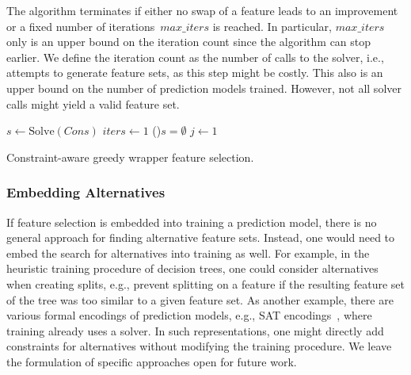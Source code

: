 \documentclass{article}
\theoremstyle{definition}
\begin{document}
The algorithm terminates if either no swap of a feature leads to an improvement or a fixed number of iterations~$max\_iters$ is reached.
In particular, $max\_iters$ only is an upper bound on the iteration count since the algorithm can stop earlier.
We define the iteration count as the number of calls to the solver, i.e., attempts to generate feature sets, as this step might be costly.
This also is an upper bound on the number of prediction models trained.
However, not all solver calls might yield a valid feature set.

\begin{algorithm}[htb]
	\DontPrintSemicolon
	\BlankLine
	$s \leftarrow \text{Solve}(Cons)$ 
	$iters \leftarrow 1$ 
	\If(){$s = \emptyset$}{
		\Return{$\emptyset$}
	}
	$j \leftarrow 1$ 
	\caption{Constraint-aware greedy wrapper feature selection.}
	\label{al:afs:greedy-wrapper}
\end{algorithm}

\subsubsection{Embedding Alternatives}
\label{sec:afs:approach:objectives:embedding}

If feature selection is embedded into training a prediction model, there is no general approach for finding alternative feature sets.
Instead, one would need to embed the search for alternatives into training as well.
For example, in the heuristic training procedure of decision trees, one could consider alternatives when creating splits, e.g., prevent splitting on a feature if the resulting feature set of the tree was too similar to a given feature set.
As another example, there are various formal encodings of prediction models, e.g., \textsc{SAT} encodings~\cite{narodytska2018learning, schidler2021sat, yu2021learning}, where training already uses a solver.
In such representations, one might directly add constraints for alternatives without modifying the training procedure.
We leave the formulation of specific approaches open for future work.
\end{document}
